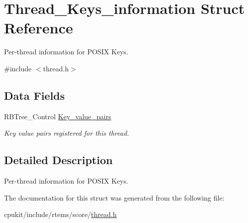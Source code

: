 \hypertarget{structThread__Keys__information}{}\section{Thread\+\_\+\+Keys\+\_\+information Struct Reference}
\label{structThread__Keys__information}


Per-\/thread information for P\+O\+S\+IX Keys.  




{\ttfamily \#include $<$thread.\+h$>$}

\subsection*{Data Fields}
\begin{DoxyCompactItemize}
\item 
\mbox{\label{structThread__Keys__information_a90d5f4b92d9795a4f7f12cb612daad0e}} 
R\+B\+Tree\+\_\+\+Control \mbox{\hyperlink{structThread__Keys__information_a90d5f4b92d9795a4f7f12cb612daad0e}{Key\+\_\+value\+\_\+pairs}}
\begin{DoxyCompactList}\small\item\em Key value pairs registered for this thread. \end{DoxyCompactList}\end{DoxyCompactItemize}


\subsection{Detailed Description}
Per-\/thread information for P\+O\+S\+IX Keys. 

The documentation for this struct was generated from the following file\+:\begin{DoxyCompactItemize}
\item 
cpukit/include/rtems/score/\mbox{\hyperlink{score_2thread_8h}{thread.\+h}}\end{DoxyCompactItemize}
